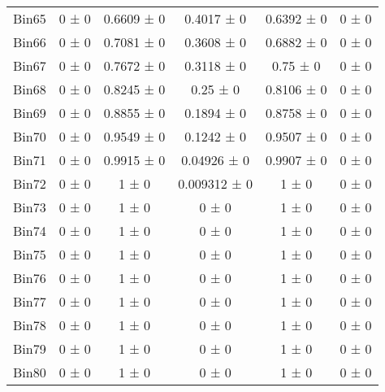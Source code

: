 \begin{tabular}{@{\extracolsep{4pt}}lccccc@{}}
     Bin65 & 0 ± 0 & 0.6609 ± 0 & 0.4017 ± 0 & 0.6392 ± 0 & 0 ± 0 \\ 
     Bin66 & 0 ± 0 & 0.7081 ± 0 & 0.3608 ± 0 & 0.6882 ± 0 & 0 ± 0 \\ 
     Bin67 & 0 ± 0 & 0.7672 ± 0 & 0.3118 ± 0 & 0.75 ± 0 & 0 ± 0 \\ 
     Bin68 & 0 ± 0 & 0.8245 ± 0 & 0.25 ± 0 & 0.8106 ± 0 & 0 ± 0 \\ 
     Bin69 & 0 ± 0 & 0.8855 ± 0 & 0.1894 ± 0 & 0.8758 ± 0 & 0 ± 0 \\ 
     Bin70 & 0 ± 0 & 0.9549 ± 0 & 0.1242 ± 0 & 0.9507 ± 0 & 0 ± 0 \\ 
     Bin71 & 0 ± 0 & 0.9915 ± 0 & 0.04926 ± 0 & 0.9907 ± 0 & 0 ± 0 \\ 
     Bin72 & 0 ± 0 & 1 ± 0 & 0.009312 ± 0 & 1 ± 0 & 0 ± 0 \\ 
     Bin73 & 0 ± 0 & 1 ± 0 & 0 ± 0 & 1 ± 0 & 0 ± 0 \\ 
     Bin74 & 0 ± 0 & 1 ± 0 & 0 ± 0 & 1 ± 0 & 0 ± 0 \\ 
     Bin75 & 0 ± 0 & 1 ± 0 & 0 ± 0 & 1 ± 0 & 0 ± 0 \\ 
     Bin76 & 0 ± 0 & 1 ± 0 & 0 ± 0 & 1 ± 0 & 0 ± 0 \\ 
     Bin77 & 0 ± 0 & 1 ± 0 & 0 ± 0 & 1 ± 0 & 0 ± 0 \\ 
     Bin78 & 0 ± 0 & 1 ± 0 & 0 ± 0 & 1 ± 0 & 0 ± 0 \\ 
     Bin79 & 0 ± 0 & 1 ± 0 & 0 ± 0 & 1 ± 0 & 0 ± 0 \\ 
     Bin80 & 0 ± 0 & 1 ± 0 & 0 ± 0 & 1 ± 0 & 0 ± 0 \\ 
\hline\hline
  \end{tabular}
